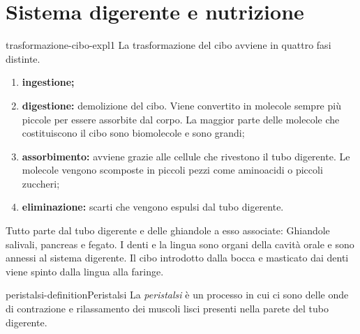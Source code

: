 \documentclass[preview]{standalone}
\begin{document}
\genpage

\section{Sistema digerente e nutrizione}

\begin{snippet}{trasformazione-cibo-expl1}
    La trasformazione del cibo avviene in quattro fasi distinte.
    \begin{enumerate}
        \item \textbf{ingestione;}
        \item \textbf{digestione:} demolizione del cibo. Viene convertito in molecole sempre più piccole per essere
        assorbite dal corpo. La maggior parte delle molecole che costituiscono il cibo sono
        biomolecole e sono grandi;
        \item \textbf{assorbimento:} avviene grazie alle cellule che rivestono il tubo digerente.
        Le molecole vengono scomposte in piccoli pezzi come aminoacidi o piccoli zuccheri;
        \item \textbf{eliminazione:} scarti che vengono
        espulsi dal tubo digerente.
    \end{enumerate}

    Tutto parte dal tubo digerente e delle ghiandole a esso associate:
    Ghiandole salivali, pancreas e fegato. I denti e la lingua sono organi
    della cavità orale e sono annessi al sistema digerente.
    Il cibo introdotto dalla bocca e masticato dai denti viene spinto dalla
    lingua alla faringe.
\end{snippet}

\begin{snippetdefinition}{peristalsi-definition}{Peristalsi}
    La \textit{peristalsi} è un processo in cui ci sono delle onde di
    contrazione e rilassamento dei muscoli lisci presenti nella
    parete del tubo digerente.
\end{snippetdefinition}
\end{document}
